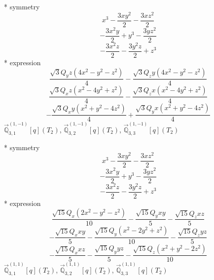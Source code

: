 \documentclass[fleqn,8pt]{jsarticle}
\begin{document}
\noindent\quad ** symmetry
\begin{dmath*}
x^{3} - \frac{3 x y^{2}}{2} - \frac{3 x z^{2}}{2}
\end{dmath*}
\begin{dmath*}
- \frac{3 x^{2} y}{2} + y^{3} - \frac{3 y z^{2}}{2}
\end{dmath*}
\begin{dmath*}
- \frac{3 x^{2} z}{2} - \frac{3 y^{2} z}{2} + z^{3}
\end{dmath*}
\noindent\quad ** expression
\begin{dmath*}
\frac{\sqrt{3} Q_{y} z \left(4 x^{2} - y^{2} - z^{2}\right)}{4} - \frac{\sqrt{3} Q_{z} y \left(4 x^{2} - y^{2} - z^{2}\right)}{4}
\end{dmath*}
\begin{dmath*}
\frac{\sqrt{3} Q_{x} z \left(x^{2} - 4 y^{2} + z^{2}\right)}{4} - \frac{\sqrt{3} Q_{z} x \left(x^{2} - 4 y^{2} + z^{2}\right)}{4}
\end{dmath*}
\begin{dmath*}
- \frac{\sqrt{3} Q_{x} y \left(x^{2} + y^{2} - 4 z^{2}\right)}{4} + \frac{\sqrt{3} Q_{y} x \left(x^{2} + y^{2} - 4 z^{2}\right)}{4}
\end{dmath*}
\noindent\quad $\vec{\mathbb{Q}}_{3,1}^{(1,-1)}[q](T_{2})$, $\vec{\mathbb{Q}}_{3,2}^{(1,-1)}[q](T_{2})$, $\vec{\mathbb{Q}}_{3,3}^{(1,-1)}[q](T_{2})$

\noindent\quad ** symmetry
\begin{dmath*}
x^{3} - \frac{3 x y^{2}}{2} - \frac{3 x z^{2}}{2}
\end{dmath*}
\begin{dmath*}
- \frac{3 x^{2} y}{2} + y^{3} - \frac{3 y z^{2}}{2}
\end{dmath*}
\begin{dmath*}
- \frac{3 x^{2} z}{2} - \frac{3 y^{2} z}{2} + z^{3}
\end{dmath*}
\noindent\quad ** expression
\begin{dmath*}
\frac{\sqrt{15} Q_{x} \left(2 x^{2} - y^{2} - z^{2}\right)}{10} - \frac{\sqrt{15} Q_{y} x y}{5} - \frac{\sqrt{15} Q_{z} x z}{5}
\end{dmath*}
\begin{dmath*}
- \frac{\sqrt{15} Q_{x} x y}{5} - \frac{\sqrt{15} Q_{y} \left(x^{2} - 2 y^{2} + z^{2}\right)}{10} - \frac{\sqrt{15} Q_{z} y z}{5}
\end{dmath*}
\begin{dmath*}
- \frac{\sqrt{15} Q_{x} x z}{5} - \frac{\sqrt{15} Q_{y} y z}{5} - \frac{\sqrt{15} Q_{z} \left(x^{2} + y^{2} - 2 z^{2}\right)}{10}
\end{dmath*}
\noindent\quad $\vec{\mathbb{Q}}_{3,1}^{(1,1)}[q](T_{2})$, $\vec{\mathbb{Q}}_{3,2}^{(1,1)}[q](T_{2})$, $\vec{\mathbb{Q}}_{3,3}^{(1,1)}[q](T_{2})$
\end{document}

